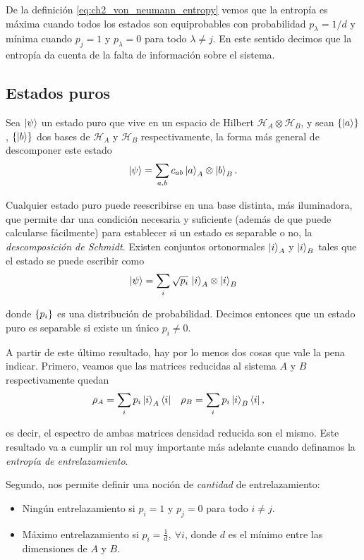 \documentclass[../main.tex]{subfiles}
\begin{document}
De la definición \eqref{eq:ch2_von_neumann_entropy} vemos que la entropía es máxima cuando todos los estados son equiprobables con probabilidad $p_\lambda = 1/d$ y mínima cuando $p_j = 1$ y $p_\lambda = 0$ para todo $\lambda \neq j$. En este sentido decimos que la entropía da cuenta de la falta de información sobre el sistema.

\subsection{Estados puros}

Sea $\left | \psi \right \rangle$ un estado puro que vive en un espacio de Hilbert $\mathcal H_A \otimes \mathcal H_B$, y sean $\left \{ \left | a \right \rangle \right \}$, $\left \{ \left | b \right \rangle \right \}$ dos bases de $\mathcal H_A$ y $\mathcal H_B$ respectivamente, la forma más general de descomponer este estado
\begin{align}
	\left | \psi \right \rangle = \sum_{a, b} c_{a b} \left | a \right \rangle_A \otimes \left | b \right \rangle_B.
\end{align}

Cualquier estado puro puede reescribirse en una base distinta, más iluminadora, que permite dar una condición necesaria y suficiente (además de que puede calcularse fácilmente) para establecer si un estado es separable o no, la \textit{descomposición de Schmidt}. Existen conjuntos ortonormales $\left | i \right \rangle_A$ y $\left | i \right \rangle_B$ tales que el estado se puede escribir como
\begin{align}
	\left | \psi \right \rangle = \sum_i \sqrt{p_i}\, \left | i \right \rangle_A \otimes \left | i \right \rangle_B
\end{align}

\noindent donde $\left \{ p_i \right \}$ es una distribución de probabilidad. Decimos entonces que un estado puro es separable si existe un único $p_i \neq 0$.

A partir de este último resultado, hay por lo menos dos cosas que vale la pena indicar. Primero, veamos que las matrices reducidas al sistema $A$ y $B$ respectivamente quedan
\begin{align}
	& \rho_A = \sum_i p_i \left | i \right \rangle_A \left \langle i \right | & & \rho_B = \sum_i p_i \left | i \right \rangle_B \left \langle i \right |,
\end{align}

\noindent es decir, el espectro de ambas matrices densidad reducida son el mismo. Este resultado va a cumplir un rol muy importante más adelante cuando definamos la \textit{entropía de entrelazamiento}.

Segundo, nos permite definir una noción de \textit{cantidad} de entrelazamiento:
\begin{itemize}[label=$\bullet$]
	
	\item Ningún entrelazamiento si $p_i = 1$ y $p_j = 0$ para todo $i \neq j$.
	
	\item Máximo entrelazamiento si $\displaystyle p_i = \frac 1{d}, \ \forall i$, donde $d$ es el mínimo entre las dimensiones de $A$ y $B$.
\end{itemize}
\end{document}
